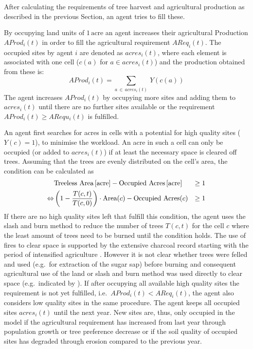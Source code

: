 After calculating the requirements of tree harvest and agricultural production as described in the previous Section, an agent tries to fill these.

By occupying land units of $1\, \text{acre}$ an agent increases their agricultural Production $AProd_i(t)$ in order to fill the agricultural requirement $AReq_i(t)$.
The occupied sites by agent $i$ are denoted as $acres_i(t)$, where each element is associated with one cell ($c(a)$ for $a \in acres_i(t)$) and the production obtained from these is:
\begin{equation}\label{AProd}
AProd_i (t) = \sum_{a \, \in \, acres_i(t)} \, Y(c(a))
\end{equation}
The agent increases $AProd_i(t)$ by occupying more sites and adding them to $acres_i(t)$ until there are no further sites available or the requirement $AProd_i(t) \geq ARequ_i(t)$ is fulfilled.

An agent first searches for acres in cells with a potential for high quality sites ($Y(c)=1$), to minimise the workload.
An acre in such a cell can only be occupied (or added to $acres_i(t)$) if at least the necessary space is cleared off trees. 
Assuming that the trees are evenly distributed on the cell's area, the condition can be calculated as 
\begin{eqnarray}
& \text{Treeless Area\,[acre]} - \text{Occupied Acres\,[acre]}  & \geq 1  \\
\Leftrightarrow & \left( 1 - \frac{T(c,t)}{T(c,0)} \right) \cdot \text{Area}(c) - \text{Occupied Acres}(c) & \geq   1
\label{eq:BurningCond}
\end{eqnarray}
If there are no high quality sites left that fulfill this condition, the agent uses the slash and burn method to reduce the number of trees $T(c,t)$ for the cell $c$ where the least amount of trees need to be burned until the condition holds.
The use of fires to clear space is supported by the extensive charcoal record starting with the period of intensified agriculture \citep{Mieth2015}. 
However it is not clear whether trees were felled and used (e.g.\ for extraction of the sugar sap) before burning and consequent agricultural use of the land \citep{Mieth2015} or slash and burn method was used directly to clear space (e.g.\ indicated by \citet{Bahn2017}). %
If after occupying all available high quality sites the requirement is not yet fulfilled, i.e.\ $AProd_i(t)<AReq_i(t)$, the agent also considers low quality sites in the same procedure.
The agent keeps all occupied sites $acres_i(t)$ until the next year.%
New sites are, thus, only occupied in the model if the agricultural requirement has increased from last year through population growth or tree preference decrease or if the soil quality of occupied sites has degraded through erosion compared to the previous year.

